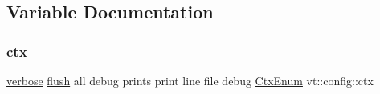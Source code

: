 \subsection{Variable Documentation}
\mbox{\label{namespacevt_1_1config_a0551245b6b893932b95aaf8eac94eed1}} 
\subsubsection{\texorpdfstring{ctx}{ctx}}
{\footnotesize\ttfamily \hyperlink{namespacevt_1_1config_a724e99568632cc0fe9c456c2230270d0a9b54bf70f7b7fe7cfb6f3da0e167ae27}{verbose} \hyperlink{namespacevt_1_1config_a724e99568632cc0fe9c456c2230270d0a5c484f36b0f33ded7e640cc30fe5e725}{flush} all debug prints print line file debug \hyperlink{namespacevt_1_1config_a46e57c33bee1b9f1fa95455af86d80e0}{Ctx\+Enum} vt\+::config\+::ctx}


